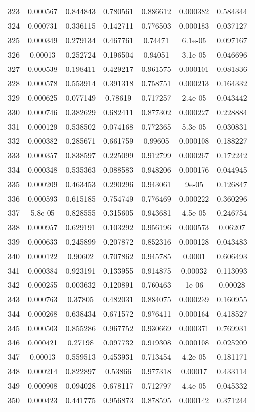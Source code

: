 \begin{table}
\begin{tabular}{c|c|c|c|c|c|c}
323 & 0.000567 & 0.844843 & 0.780561 & 0.886612 & 0.000382 & 0.584344\\
324 & 0.000731 & 0.336115 & 0.142711 & 0.776503 & 0.000183 & 0.037127\\
325 & 0.000349 & 0.279134 & 0.467761 & 0.74471 & 6.1e-05 & 0.097167\\
326 & 0.00013 & 0.252724 & 0.196504 & 0.94051 & 3.1e-05 & 0.046696\\
327 & 0.000538 & 0.198411 & 0.429217 & 0.961575 & 0.000101 & 0.081836\\
328 & 0.000578 & 0.553914 & 0.391318 & 0.758751 & 0.000213 & 0.164332\\
329 & 0.000625 & 0.077149 & 0.78619 & 0.717257 & 2.4e-05 & 0.043442\\
330 & 0.000746 & 0.382629 & 0.682411 & 0.877302 & 0.000227 & 0.228884\\
331 & 0.000129 & 0.538502 & 0.074168 & 0.772365 & 5.3e-05 & 0.030831\\
332 & 0.000382 & 0.285671 & 0.661759 & 0.99605 & 0.000108 & 0.188227\\
333 & 0.000357 & 0.838597 & 0.225099 & 0.912799 & 0.000267 & 0.172242\\
334 & 0.000348 & 0.535363 & 0.088583 & 0.948206 & 0.000176 & 0.044945\\
335 & 0.000209 & 0.463453 & 0.290296 & 0.943061 & 9e-05 & 0.126847\\
336 & 0.000593 & 0.615185 & 0.754749 & 0.776469 & 0.000222 & 0.360296\\
337 & 5.8e-05 & 0.828555 & 0.315605 & 0.943681 & 4.5e-05 & 0.246754\\
338 & 0.000957 & 0.629191 & 0.103292 & 0.956196 & 0.000573 & 0.06207\\
339 & 0.000633 & 0.245899 & 0.207872 & 0.852316 & 0.000128 & 0.043483\\
340 & 0.000122 & 0.90602 & 0.707862 & 0.945785 & 0.0001 & 0.606493\\
341 & 0.000384 & 0.923191 & 0.133955 & 0.914875 & 0.00032 & 0.113093\\
342 & 0.000255 & 0.003632 & 0.120891 & 0.760463 & 1e-06 & 0.00028\\
343 & 0.000763 & 0.37805 & 0.482031 & 0.884075 & 0.000239 & 0.160955\\
344 & 0.000268 & 0.638434 & 0.671572 & 0.976411 & 0.000164 & 0.418527\\
345 & 0.000503 & 0.855286 & 0.967752 & 0.930669 & 0.000371 & 0.769931\\
346 & 0.000421 & 0.27198 & 0.097732 & 0.949308 & 0.000108 & 0.025209\\
347 & 0.00013 & 0.559513 & 0.453931 & 0.713454 & 4.2e-05 & 0.181171\\
348 & 0.000214 & 0.822897 & 0.53866 & 0.977318 & 0.00017 & 0.433114\\
349 & 0.000908 & 0.094028 & 0.678117 & 0.712797 & 4.4e-05 & 0.045332\\
350 & 0.000423 & 0.441775 & 0.956873 & 0.878595 & 0.000142 & 0.371244\\
\end{tabular}
\end{table}
